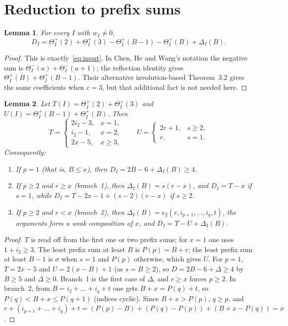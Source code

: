 \documentclass[11pt]{article}
\newtheorem{lemma}{Lemma}
\theoremstyle{remark}
\theoremstyle{definition}
\newcommand{\rev}{\overline}
\newcommand{\Tp}{\Theta^{+}}
\newcommand{\Tm}{\Theta^{-}}
\begin{document}
\section{Reduction to prefix sums}

\begin{lemma}\label{lem:phi}
For every $I$ with $w_I\ne 0$,
\[
D_I=\Tp_I(2)+\Tp_I(3)-\Tp_I(B-1)-\Tp_I(B)+\Delta_I(B).
\]
\end{lemma}
\begin{proof}
This is exactly~\eqref{eq:input}. In Chen, He and Wang's notation the negative sum is $\Tm_{\rev I}(a)+\Tm_{\rev I}(a+1)$; the reflection identity gives $\Tp_I(B)+\Tp_I(B-1)$. Their alternative involution-based Theorem~3.2 gives the same coefficients when $c=3$, but that additional fact is not needed here.
\end{proof}

\begin{lemma}\label{lem:closed}
Let $T(I)=\Tp_I(2)+\Tp_I(3)$ and $U(I)=\Tp_I(B-1)+\Tp_I(B)$. Then
\[
T=\begin{cases}2i_2-3,&x=1,\\ i_2-1,&x=2,\\ 2x-5,&x\ge3,\end{cases}\qquad
U=\begin{cases}2r+1,&s\ge2,\\ r,&s=1.\end{cases}
\]
Consequently:
\begin{enumerate}
\item If $p=1$ (that is, $B\le x$), then $D_I=2B-6+\Delta_I(B)\ge4$.
\item If $p\ge2$ and $r\ge x$ (branch~1), then $\Delta_I(B)=s(r-x)$, and $D_I=T-x$ if $s=1$, while $D_I=T-2x-1+(s-2)(r-x)$ if $s\ge2$.
\item If $p\ge2$ and $r<x$ (branch~2), then $\Delta_I(B)=e_2(r,i_{p+1},\dots,i_q,t)$, the arguments form a weak composition of $x$, and $D_I=T-U+\Delta_I(B)$.
\end{enumerate}
\end{lemma}
\begin{proof}
$T$ is read off from the first one or two prefix sums; for $x=1$ one uses $1+i_2\ge3$. The least prefix sum at least $B$ is $P(p)=B+r$; the least prefix sum at least $B-1$ is $\sigma$ when $s=1$ and $P(p)$ otherwise, which gives $U$. For $p=1$, $T=2x-5$ and $U=2(x-B)+1$ (as $s=B\ge2$), so $D=2B-6+\Delta\ge4$ by $B\ge5$ and $\Delta\ge0$. Branch~1 is the first case of $\Delta$, and $r\ge x$ forces $p\ge2$. In branch~2, from $B=i_2+\dots+i_q+t$ one gets $B+x=P(q)+t$, so $P(q)<B+x\le P(q+1)$ (indices cyclic). Since $B+x>P(p)$, $q\ge p$, and
$r+(i_{p+1}+\dots+i_q)+t=(P(p)-B)+(P(q)-P(p))+(B+x-P(q))=x$.
\end{proof}
\end{document}
